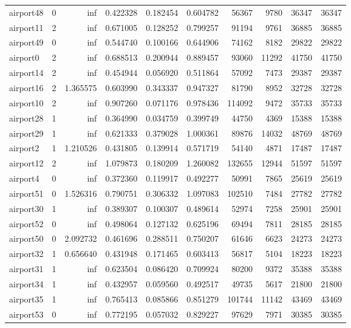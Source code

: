 \documentclass[../../../thesis.tex]{subfiles}
\begin{document}
\begin{longtable}{|l|r|r|r|r|r|r|r|r|r|}
airport48 & 0 & inf & 0.422328 & 0.182454 & 0.604782 & 56367 & 9780 & 36347 & 36347 \\
airport11 & 2 & inf & 0.671005 & 0.128252 & 0.799257 & 91194 & 9761 & 36885 & 36885 \\
airport49 & 0 & inf & 0.544740 & 0.100166 & 0.644906 & 74162 & 8182 & 29822 & 29822 \\
airport0 & 2 & inf & 0.688513 & 0.200944 & 0.889457 & 93060 & 11292 & 41750 & 41750 \\
airport14 & 2 & inf & 0.454944 & 0.056920 & 0.511864 & 57092 & 7473 & 29387 & 29387 \\
airport16 & 2 & 1.365575 & 0.603990 & 0.343337 & 0.947327 & 81790 & 8952 & 32728 & 32728 \\
airport10 & 2 & inf & 0.907260 & 0.071176 & 0.978436 & 114092 & 9472 & 35733 & 35733 \\
airport28 & 1 & inf & 0.364990 & 0.034759 & 0.399749 & 44750 & 4369 & 15388 & 15388 \\
airport29 & 1 & inf & 0.621333 & 0.379028 & 1.000361 & 89876 & 14032 & 48769 & 48769 \\
airport2 & 1 & 1.210526 & 0.431805 & 0.139914 & 0.571719 & 54140 & 4871 & 17487 & 17487 \\
airport12 & 2 & inf & 1.079873 & 0.180209 & 1.260082 & 132655 & 12944 & 51597 & 51597 \\
airport4 & 0 & inf & 0.372360 & 0.119917 & 0.492277 & 50991 & 7865 & 25619 & 25619 \\
airport51 & 0 & 1.526316 & 0.790751 & 0.306332 & 1.097083 & 102510 & 7484 & 27782 & 27782 \\
airport30 & 1 & inf & 0.389307 & 0.100307 & 0.489614 & 52974 & 7258 & 25901 & 25901 \\
airport52 & 0 & inf & 0.498064 & 0.127132 & 0.625196 & 69494 & 7811 & 28185 & 28185 \\
airport50 & 0 & 2.092732 & 0.461696 & 0.288511 & 0.750207 & 61646 & 6623 & 24273 & 24273 \\
airport32 & 1 & 0.656640 & 0.431948 & 0.171465 & 0.603413 & 56817 & 5104 & 18223 & 18223 \\
airport31 & 1 & inf & 0.623504 & 0.086420 & 0.709924 & 80200 & 9372 & 35388 & 35388 \\
airport34 & 1 & inf & 0.432957 & 0.059560 & 0.492517 & 49735 & 5617 & 21800 & 21800 \\
airport35 & 1 & inf & 0.765413 & 0.085866 & 0.851279 & 101744 & 11142 & 43469 & 43469 \\
airport53 & 0 & inf & 0.772195 & 0.057032 & 0.829227 & 97629 & 7971 & 30385 & 30385 \\

\end{longtable}
\end{document}
